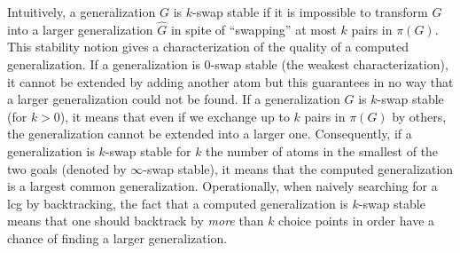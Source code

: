 Intuitively, a generalization $G$ is $k$-swap stable if it is impossible to transform $G$ into a larger generalization $\hat{G}$ in spite of ``swapping'' at most $k$ pairs in $\pi(G)$.
This stability notion gives a characterization of the quality of a computed generalization. If a generalization is 0-swap stable (the weakest characterization), it cannot be extended by adding another atom but this guarantees in no way that a larger generalization could not be found. If a generalization $G$ is $k$-swap stable (for $k>0$), it means that even if we exchange up to $k$ pairs in $\pi(G)$ by others, the generalization cannot be extended into a larger one. Consequently, if a generalization is $k$-swap stable for $k$ the number of atoms in the smallest of the two goals (denoted by $\infty$-swap stable), it means that the computed generalization is a largest common generalization. 
%
Operationally, when naively searching for a lcg by backtracking, the fact that a computed generalization is $k$-swap stable means that one should backtrack by \textit{more} than $k$ choice points in order have a chance of finding a larger generalization. 


